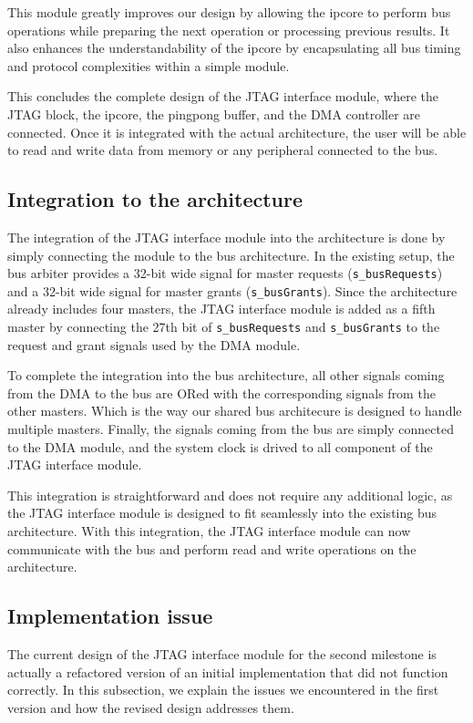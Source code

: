 \documentclass[a4paper,11pt,oneside]{report}
\begin{document}
This module greatly improves our design by allowing the ipcore to perform bus operations while preparing the next operation or processing previous results.  
It also enhances the understandability of the ipcore by encapsulating all bus timing and protocol complexities within a simple module.

This concludes the complete design of the JTAG interface module,  
where the JTAG block, the ipcore, the pingpong buffer, and the DMA controller are connected.  
Once it is integrated with the actual architecture, the user will be able to read and write data from memory or any peripheral connected to the bus.

\subsection{Integration to the architecture}

The integration of the JTAG interface module into the architecture is done by simply connecting the module to the bus architecture.  
In the existing setup, the bus arbiter provides a 32-bit wide signal for master requests (\texttt{s\_busRequests}) and a 32-bit wide signal for master grants (\texttt{s\_busGrants}).  
Since the architecture already includes four masters, the JTAG interface module is added as a fifth master by connecting the 27th bit of \texttt{s\_busRequests} and \texttt{s\_busGrants}  
to the request and grant signals used by the DMA module.  

To complete the integration into the bus architecture, all other signals coming from the DMA to the bus are ORed with the corresponding signals from the other masters.  
Which is the way our shared bus architecure is designed to handle multiple masters.
Finally, the signals coming from the bus are simply connected to the DMA module, and the system clock is drived to all component of the JTAG interface module.

This integration is straightforward and does not require any additional logic, as the JTAG interface module is designed to fit seamlessly into the existing bus architecture.
With this integration, the JTAG interface module can now communicate with the bus and perform read and write operations on the architecture.

\subsection{Implementation issue}

The current design of the JTAG interface module for the second milestone is actually a refactored version of an initial implementation that did not function correctly.  
In this subsection, we explain the issues we encountered in the first version and how the revised design addresses them.
\end{document}
